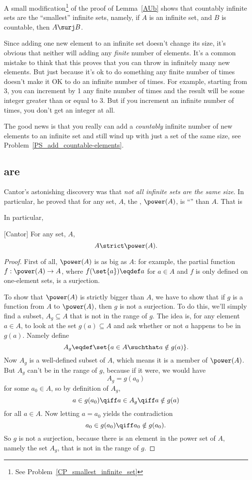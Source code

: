A small modification\footnote{See
  Problem~\ref{CP_smallest_infinite_set}} of the proof of
Lemma~\ref{AUb} shows that countably infinite sets are the
``smallest'' infinite sets, namely, if $A$ is an infinite set, and $B$
is countable, then $A \surj B$.

Since adding one new element to an infinite set doesn't change its
size, it's obvious that neither will adding any \emph{finite} number
of elements.  It's a common mistake to think that this proves that you
can throw in infinitely many new elements.  But just because it's ok
to do something any finite number of times doesn't make it OK to do an
infinite number of times.  For example, starting from 3, you can
increment by 1 any finite number of times and the result will be some
integer greater than or equal to 3.  But if you increment an infinite
number of times, you don't get an integer at all.

The good news is that you really can add a
\emph{countably} infinite number of new elements to an infinite set
and still wind up with just a set of the same size, see
Problem~\ref{PS_add_countable-elements}.

\subsection{ are }

Cantor's astonishing discovery was that \emph{not all infinite sets
  are the same size}.  In particular, he proved that for any set, $A$,
the , $\power(A)$, is ``'' than
$A$.  That is

In particular,
\begin{theorem}\label{powbig}[Cantor]\mbox{}
For any set, $A$,
\[
A \strict \power(A).
\]
\end{theorem}
\begin{proof}
  First of all, $\power(A)$ is as big as $A$: for example, the partial
  function $f:\power(A) \to A$, where $f(\set{a}) \eqdef a$ for $a \in
  A$ and $f$ is only defined on one-element sets, is a surjection.

  To show that $\power(A)$ is strictly bigger than $A$, we have to
  show that if $g$ is a function from $A$ to $\power(A)$, then $g$ is
  not a surjection.  To do this, we'll simply find a subset, $A_g
  \subseteq A$ that is not in the range of $g$.  The idea is, for any
  element $a \in A$, to look at the set $g(a) \subseteq A$ and ask
  whether or not $a$ happens to be in $g(a)$.  Namely define \iffalse
  mimicking Russell's Paradox,\fi
  \[
  A_g \eqdef \set{a \in A \suchthat a \notin g(a)}.
  \]
  Now $A_g$ is a well-defined subset of $A$, which means it is a
  member of $\power(A)$.  But $A_g$ can't be in the range of $g$,
  because if it were, we would have
\[
A_g = g(a_0)
\]
for some $a_0 \in A$, so by definition of $A_g$,
\[
a \in g(a_0) \qiff a \in A_g \qiff a \notin g(a)
\]
for all $a \in A$.  Now letting $a = a_0$ yields the contradiction
\[
a_0 \in g(a_0) \qiff a_0 \notin g(a_0).
\]
So $g$ is not a surjection, because there is an element in the power
set of $A$, namely the set $A_g$, that is not in the range of $g$.
\end{proof}

